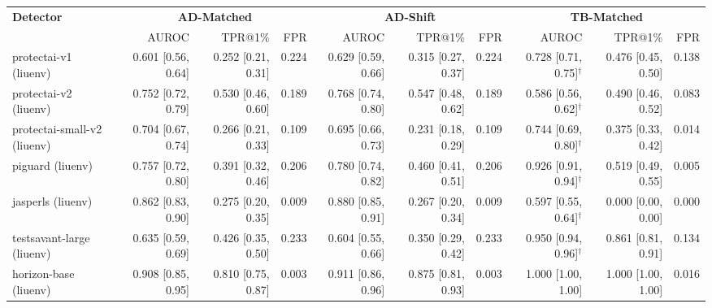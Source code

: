 \begin{tabular}{lrrrrrrrrr}
\toprule
\textbf{Detector} & \multicolumn{3}{c}{\textbf{AD-Matched}} & \multicolumn{3}{c}{\textbf{AD-Shift}} & \multicolumn{3}{c}{\textbf{TB-Matched}} \\
 & AUROC & TPR@1\% & FPR & AUROC & TPR@1\% & FPR & AUROC & TPR@1\% & FPR \\
\midrule
protectai-v1 (liuenv) & 0.601 {\scriptsize[0.56, 0.64]} & 0.252 {\scriptsize[0.21, 0.31]} & 0.224 & 0.629 {\scriptsize[0.59, 0.66]} & 0.315 {\scriptsize[0.27, 0.37]} & 0.224 & 0.728 {\scriptsize[0.71, 0.75]}$^\dagger$ & 0.476 {\scriptsize[0.45, 0.50]} & 0.138 \\
protectai-v2 (liuenv) & 0.752 {\scriptsize[0.72, 0.79]} & 0.530 {\scriptsize[0.46, 0.60]} & 0.189 & 0.768 {\scriptsize[0.74, 0.80]} & 0.547 {\scriptsize[0.48, 0.62]} & 0.189 & 0.586 {\scriptsize[0.56, 0.62]}$^\dagger$ & 0.490 {\scriptsize[0.46, 0.52]} & 0.083 \\
protectai-small-v2 (liuenv) & 0.704 {\scriptsize[0.67, 0.74]} & 0.266 {\scriptsize[0.21, 0.33]} & 0.109 & 0.695 {\scriptsize[0.66, 0.73]} & 0.231 {\scriptsize[0.18, 0.29]} & 0.109 & 0.744 {\scriptsize[0.69, 0.80]}$^\dagger$ & 0.375 {\scriptsize[0.33, 0.42]} & 0.014 \\
piguard (liuenv) & 0.757 {\scriptsize[0.72, 0.80]} & 0.391 {\scriptsize[0.32, 0.46]} & 0.206 & 0.780 {\scriptsize[0.74, 0.82]} & 0.460 {\scriptsize[0.41, 0.51]} & 0.206 & 0.926 {\scriptsize[0.91, 0.94]}$^\dagger$ & 0.519 {\scriptsize[0.49, 0.55]} & 0.005 \\
jasperls (liuenv) & 0.862 {\scriptsize[0.83, 0.90]} & 0.275 {\scriptsize[0.20, 0.35]} & 0.009 & 0.880 {\scriptsize[0.85, 0.91]} & 0.267 {\scriptsize[0.20, 0.34]} & 0.009 & 0.597 {\scriptsize[0.55, 0.64]}$^\dagger$ & 0.000 {\scriptsize[0.00, 0.00]} & 0.000 \\
testsavant-large (liuenv) & 0.635 {\scriptsize[0.59, 0.69]} & 0.426 {\scriptsize[0.35, 0.50]} & 0.233 & 0.604 {\scriptsize[0.55, 0.66]} & 0.350 {\scriptsize[0.29, 0.42]} & 0.233 & 0.950 {\scriptsize[0.94, 0.96]}$^\dagger$ & 0.861 {\scriptsize[0.81, 0.91]} & 0.134 \\
horizon-base (liuenv) & 0.908 {\scriptsize[0.85, 0.95]} & 0.810 {\scriptsize[0.75, 0.87]} & 0.003 & 0.911 {\scriptsize[0.86, 0.96]} & 0.875 {\scriptsize[0.81, 0.93]} & 0.003 & 1.000 {\scriptsize[1.00, 1.00]} & 1.000 {\scriptsize[1.00, 1.00]} & 0.016 \\

\end{tabular}
